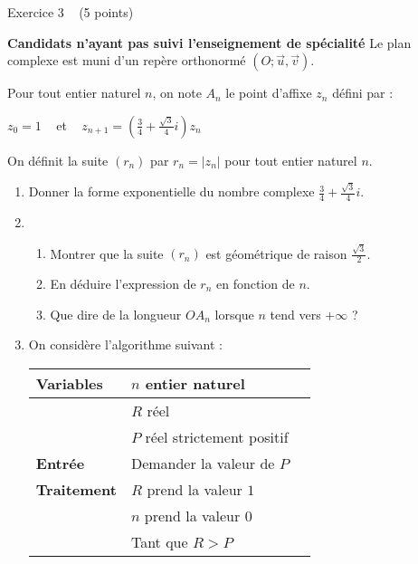 
%
\begin{h2}Exercice 3   (5 points)\end{h2}
\textbf{Candidats n'ayant pas suivi l'enseignement de spécialité}
Le plan complexe est muni d'un repère orthonormé $\left(O; \vec{u}, \vec{v}\right)$.
\par
Pour tout entier naturel $n$, on note $A_{n}$ le point d'affixe $z_{n}$ défini par :
\par
$z_{0}=1$     et    $ z_{n+1}=\left(\frac{3}{4}+\frac{\sqrt{3}}{4}i\right)z_{n}$
\par
On définit la suite $\left(r_{n}\right)$ par $r_{n}=|z_{n}|$ pour tout entier naturel $n$.
\begin{enumerate}
     \item
     Donner la forme exponentielle du nombre complexe $\frac{3}{4}+\frac{\sqrt{3}}{4}i$.
     \item
     \begin{enumerate}[label=\alph*.]
          \item
          Montrer que la suite $\left(r_{n}\right)$ est géométrique de raison $\frac{\sqrt{3}}{2}$.
          \item
          En déduire l'expression de $r_{n}$ en fonction de $n$.
          \item
          Que dire de la longueur $OA_{n}$ lorsque $n$ tend vers $+ \infty $ ?
     \end{enumerate}
     \item
     On considère l'algorithme suivant :
     \begin{tabularx}{0.8\linewidth}{|*{3}{>{\centering \arraybackslash }X|}}%
          \hline
          \textbf{Variables} &  $n$ entier naturel
          \\ \hline
          & $R$ réel
          \\ \hline
          & $P$ réel strictement positif
          \\ \hline
          \textbf{Entrée} &  Demander la valeur de $P$
          \\ \hline
          \textbf{Traitement}  & $R$ prend la valeur $1$
          \\ \hline
          & $n$ prend la valeur $0$
          \\ \hline
          & Tant que $R > P$
          \\ \hline

\end{tabularx}
\end{enumerate}

